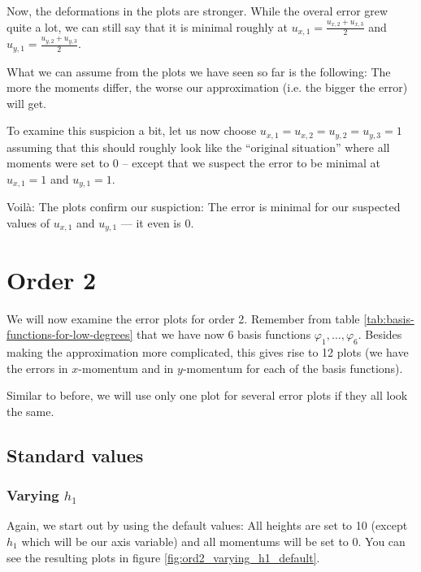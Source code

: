 \documentclass{article}
\renewcommand{\phi}{\varphi}
\begin{document}


Now, the deformations in the plots are stronger. While the overal error grew quite a lot, we can still say that it is minimal roughly at $u_{x,1}=\frac{u_{x,2}+u_{x,3}}{2}$ and $u_{y,1}=\frac{u_{y,2}+u_{y,3}}{2}$.

What we can assume from the plots we have seen so far is the following: The more the moments differ, the worse our approximation (i.e. the bigger the error) will get.

To examine this suspicion a bit, let us now choose $u_{x,1}=u_{x,2}=u_{y,2}=u_{y,3}=1$ assuming that this should roughly look like the ``original situation'' where all moments were set to 0 -- except that we suspect the error to be minimal at $u_{x,1}=1$ and $u_{y,1}=1$.



Voilà: The plots confirm our suspiction: The error is minimal for our suspected values of $u_{x,1}$ and $u_{y,1}$ --- it even is 0.

\clearpage{}

\section{Order 2}
\label{sec:stiffness-analyis-ord-2}

We will now examine the error plots for order 2. Remember from table \ref{tab:basis-functions-for-low-degrees} that we have now 6 basis functions $\phi_1,\dots,\phi_6$. Besides making the approximation more complicated, this gives rise to 12 plots (we have the errors in $x$-momentum and in $y$-momentum for each of the basis functions).

Similar to before, we will use only one plot for several error plots if they all look the same.

\subsection{Standard values}
\label{sec:stiffness-analyiss-ord2-default}

\subsubsection{Varying $h_1$}
\label{sec:stiffness-analysis-ord2-default-var-h1}

Again, we start out by using the default values: All heights are set to 10 (except $h_1$ which will be our axis variable) and all momentums will be set to 0. You can see the resulting plots in figure \ref{fig:ord2_varying_h1_default}. 
\end{document}
